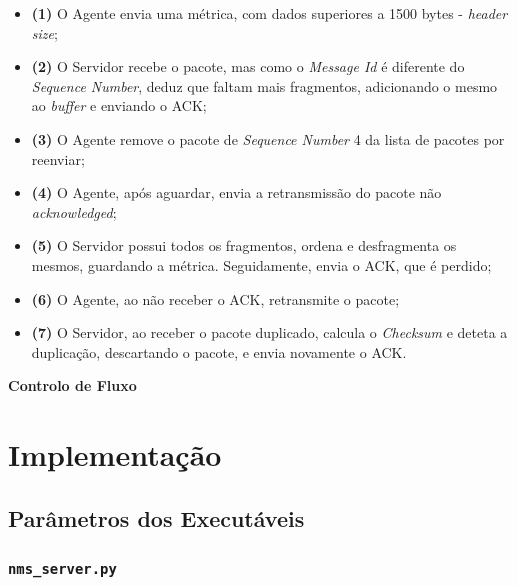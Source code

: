 \documentclass[a4paper,12pt]{scrreprt}
\begin{document}
\begin{itemize}
    \item\textbf{(1)} O Agente envia uma métrica, com dados superiores a 1500 bytes - \textit{header size};
    \item\textbf{(2)} O Servidor recebe o pacote, mas como o \textit{Message Id} é diferente do \textit{Sequence Number}, deduz que
    faltam mais fragmentos, adicionando o mesmo ao \textit{buffer} e enviando o ACK;
    \item\textbf{(3)} O Agente remove o pacote de \textit{Sequence Number} 4 da lista de pacotes por reenviar;
    \item\textbf{(4)} O Agente, após aguardar, envia a retransmissão do pacote não \textit{acknowledged};
    \item\textbf{(5)} O Servidor possui todos os fragmentos, ordena e desfragmenta os mesmos, guardando a métrica. Seguidamente, envia
    o ACK, que é perdido;
    \item\textbf{(6)} O Agente, ao não receber o ACK, retransmite o pacote;
    \item\textbf{(7)} O Servidor, ao receber o pacote duplicado, calcula o \textit{Checksum} e deteta a duplicação, descartando o pacote, e 
    envia novamente o ACK.
\end{itemize}
    

\textbf{Controlo de Fluxo}



\chapter{Implementação}

\section{Parâmetros dos Executáveis}

\subsection{\texttt{nms\_server.py}}
\end{document}

